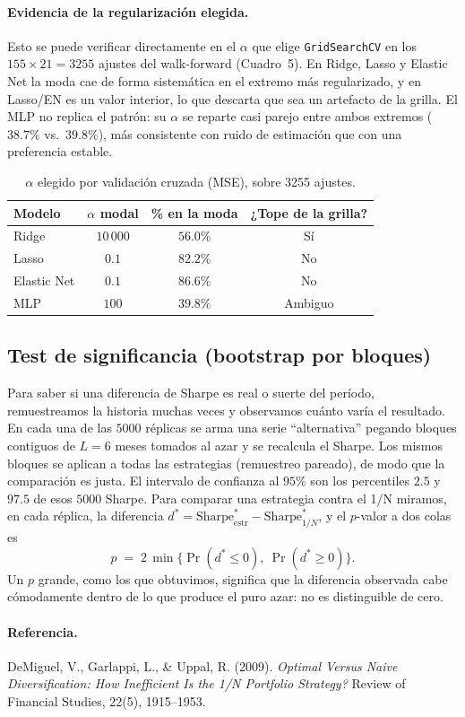\documentclass[11pt]{article}
\begin{document}
\paragraph{Evidencia de la regularización elegida.} Esto se puede verificar directamente en el
$\alpha$ que elige \texttt{GridSearchCV} en los $155\times21=3255$ ajustes del walk-forward
(Cuadro~5). En Ridge, Lasso y Elastic Net la moda cae de forma sistemática en el extremo más
regularizado, y en Lasso/EN es
un valor interior, lo que descarta que sea un artefacto de la grilla. El MLP no
replica el patrón: su $\alpha$ se reparte casi parejo entre ambos extremos ($38.7\%$ vs.\ $39.8\%$),
más consistente con ruido de estimación que con una preferencia estable.

\begin{table}[h]
\centering
\caption{$\alpha$ elegido por validación cruzada (MSE), sobre 3255 ajustes.}
\begin{tabular}{lccc}
\toprule
Modelo & $\alpha$ modal & \% en la moda & ¿Tope de la grilla? \\
\midrule
Ridge       & $10\,000$ & $56.0\%$ & Sí \\
Lasso       & $0.1$     & $82.2\%$ & No \\
Elastic Net & $0.1$     & $86.6\%$ & No \\
MLP         & $100$     & $39.8\%$ & Ambiguo \\
\bottomrule
\end{tabular}
\end{table}

 
\subsection*{Test de significancia (bootstrap por bloques)}
 
Para saber si una diferencia de Sharpe es real o suerte del período, remuestreamos la historia muchas
veces y observamos cuánto varía el resultado. En cada una de las $5000$ réplicas se arma una serie
``alternativa'' pegando bloques contiguos de $L=6$ meses tomados al azar y se recalcula el Sharpe. Los mismos bloques se
aplican a todas las estrategias (remuestreo pareado), de modo que la comparación es justa. El intervalo
de confianza al $95\%$ son los percentiles $2.5$ y $97.5$ de esos $5000$ Sharpe. Para comparar una
estrategia contra el 1/N miramos, en cada réplica, la diferencia
$d^{*}=\text{Sharpe}^{*}_{\text{estr}}-\text{Sharpe}^{*}_{1/N}$, y el $p$-valor a dos colas es
\[
p \;=\; 2\,\min\big\{\Pr(d^{*}\le 0),\ \Pr(d^{*}\ge 0)\big\}.
\]
Un $p$ grande, como los que obtuvimos, significa que la diferencia observada cabe cómodamente dentro
de lo que produce el puro azar: no es distinguible de cero.


\paragraph{Referencia.}
DeMiguel, V., Garlappi, L., \& Uppal, R. (2009). \emph{Optimal Versus Naive Diversification: How
Inefficient Is the 1/N Portfolio Strategy?} Review of Financial Studies, 22(5), 1915--1953.
\end{document}
